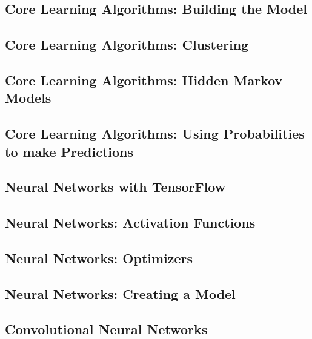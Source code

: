 \documentclass{article}%
\begin{document}
%
\subsection{Core Learning Algorithms: Building the Model}%
\label{subsec:CoreLearningAlgorithmsBuildingtheModel}%

%
\subsection{Core Learning Algorithms: Clustering}%
\label{subsec:CoreLearningAlgorithmsClustering}%

%
\subsection{Core Learning Algorithms: Hidden Markov Models}%
\label{subsec:CoreLearningAlgorithmsHiddenMarkovModels}%

%
\subsection{Core Learning Algorithms: Using Probabilities to make Predictions}%
\label{subsec:CoreLearningAlgorithmsUsingProbabilitiestomakePredictions}%

%
\subsection{Neural Networks with TensorFlow}%
\label{subsec:NeuralNetworkswithTensorFlow}%

%
\subsection{Neural Networks: Activation Functions}%
\label{subsec:NeuralNetworksActivationFunctions}%

%
\subsection{Neural Networks: Optimizers}%
\label{subsec:NeuralNetworksOptimizers}%

%
\subsection{Neural Networks: Creating a Model}%
\label{subsec:NeuralNetworksCreatingaModel}%

%
\subsection{Convolutional Neural Networks}%
\label{subsec:ConvolutionalNeuralNetworks}%
\end{document}
